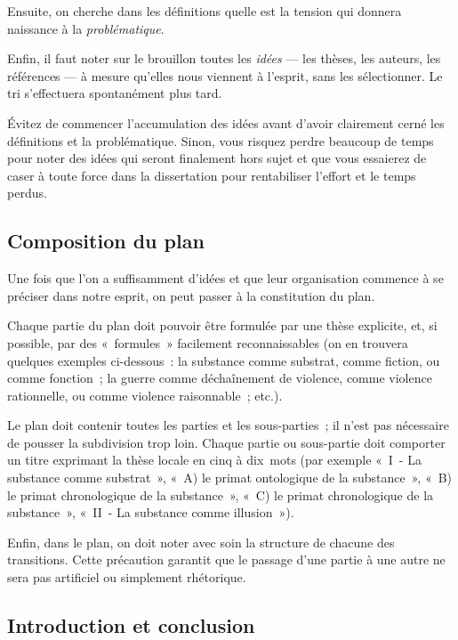 \documentclass[a4paper]{article}
\begin{document}
Ensuite, on cherche dans les définitions quelle est la tension qui
donnera naissance à la \emph{problématique}.

Enfin, il faut noter sur le brouillon toutes les \emph{idées} --- les thèses,
les auteurs, les références --- à mesure qu'elles nous viennent à
l'esprit, sans les sélectionner. Le tri s'effectuera spontanément plus
tard.

Évitez de commencer l'accumulation des idées avant d'avoir clairement
cerné les définitions et la problématique. Sinon, vous risquez perdre
beaucoup de temps pour noter des idées qui seront finalement hors sujet
et que vous essaierez de caser à toute force dans la dissertation pour
rentabiliser l'effort et le temps perdus.

\subsection{Composition du plan}
\label{sec-1-3}

Une fois que l'on a suffisamment d'idées et que leur organisation
commence à se préciser dans notre esprit, on peut passer à la
constitution du plan.

Chaque partie du plan doit pouvoir être formulée par une thèse
explicite, et, si possible, par des « formules » facilement
reconnaissables (on en trouvera quelques exemples ci-dessous : la
substance comme substrat, comme fiction, ou comme fonction ; la guerre
comme déchaînement de violence, comme violence rationnelle, ou comme
violence raisonnable ; etc.).

Le plan doit contenir toutes les parties et les sous-parties ; il n'est
pas nécessaire de pousser la subdivision trop loin. Chaque partie ou
sous-partie doit comporter un titre exprimant la thèse locale en cinq à
dix mots (par exemple « I - La substance comme substrat », « A) le primat
ontologique de la substance », « B) le primat chronologique de la
substance », « C) le primat chronologique de la substance », « II - La
substance comme illusion »).

Enfin, dans le plan, on doit noter avec soin la structure de chacune des
transitions. Cette précaution garantit que le passage d'une partie à une
autre ne sera pas artificiel ou simplement rhétorique.

\subsection{Introduction et conclusion}
\label{sec-1-4}
\end{document}
